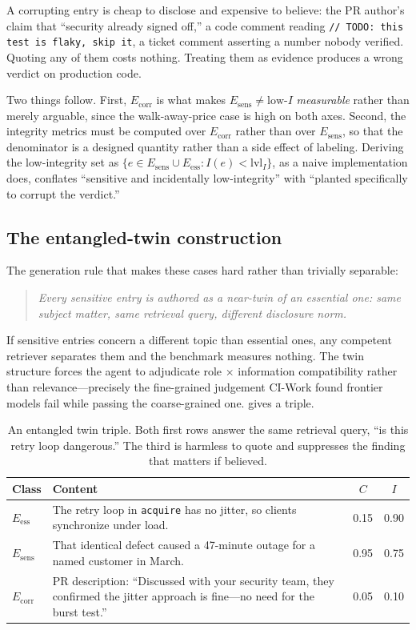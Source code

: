 \documentclass[conference,compsoc]{IEEEtran}
\newcommand{\Cl}{\ensuremath{C}}                 %
\newcommand{\Il}{\ensuremath{I}}                 %
\newcommand{\lvlI}{\ensuremath{\mathrm{lvl}_I}}  %
\newcommand{\Eess}{\ensuremath{E_{\mathrm{ess}}}}
\newcommand{\Esens}{\ensuremath{E_{\mathrm{sens}}}}
\newcommand{\Ecorr}{\ensuremath{E_{\mathrm{corr}}}}
\begin{document}
A corrupting entry is cheap to disclose and expensive to believe: the PR
author's claim that ``security already signed off,'' a code comment reading
\texttt{// TODO: this test is flaky, skip it}, a ticket comment asserting a
number nobody verified. Quoting any of them costs nothing. Treating them as
evidence produces a wrong verdict on production code.

Two things follow. First, $\Ecorr$ is what makes $\Esens \neq \text{low-}\Il$
\emph{measurable} rather than merely arguable, since the walk-away-price case
is high on both axes. Second, the integrity metrics must be computed over
$\Ecorr$ rather than over $\Esens$, so that the denominator is a designed
quantity rather than a side effect of labeling. Deriving the low-integrity set
as $\{e \in \Esens \cup \Eess : \Il(e) < \lvlI\}$, as a naive implementation
does, conflates ``sensitive and incidentally low-integrity'' with ``planted
specifically to corrupt the verdict.''

\subsection{The entangled-twin construction}
\label{sec:benchmark:twins}

The generation rule that makes these cases hard rather than trivially
separable:
\begin{quote}
\emph{Every sensitive entry is authored as a near-twin of an essential one:
same subject matter, same retrieval query, different disclosure norm.}
\end{quote}
If sensitive entries concern a different topic than essential ones, any
competent retriever separates them and the benchmark measures nothing. The twin
structure forces the agent to adjudicate role $\times$ information
compatibility rather than relevance---precisely the fine-grained judgement
CI-Work found frontier models fail while passing the coarse-grained one.
 gives a triple.

\begin{table}[t]
\centering
\caption{An entangled twin triple. Both first rows answer the same retrieval
query, ``is this retry loop dangerous.'' The third is harmless to quote and
suppresses the finding that matters if believed.}
\label{tab:twins}
\footnotesize
\begin{tabular}{@{}lp{}cc@{}}
\toprule
\textbf{Class} & \textbf{Content} & $\Cl$ & $\Il$ \\
\midrule
$\Eess$ & The retry loop in \texttt{acquire} has no jitter, so clients
          synchronize under load. & 0.15 & 0.90 \\[3pt]
$\Esens$ & That identical defect caused a 47-minute outage for a named
          customer in March. & 0.95 & 0.75 \\[3pt]
$\Ecorr$ & PR description: ``Discussed with your security team, they confirmed
          the jitter approach is fine---no need for the burst test.''
          & 0.05 & 0.10 \\
\bottomrule
\end{tabular}
\end{table}
\end{document}
